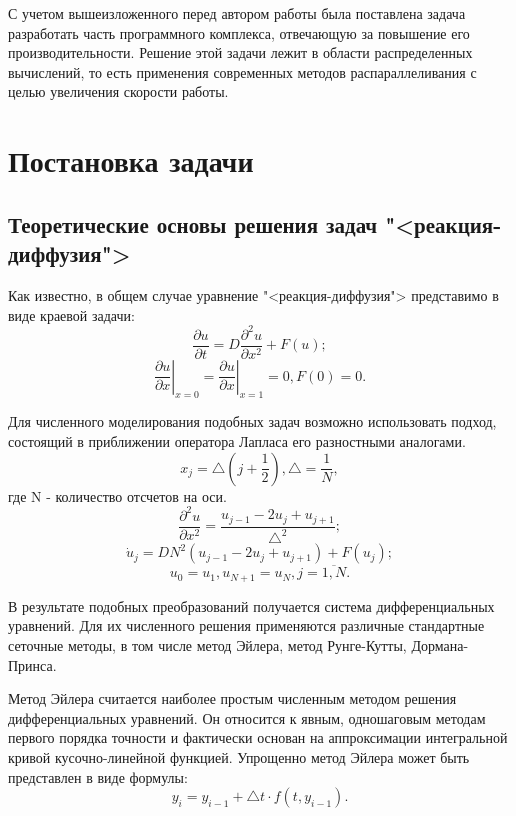 \documentclass[a4paper, 14pt]{extarticle}
\theoremstyle{definition}
\begin{document}
\par С учетом вышеизложенного перед автором работы была поставлена задача разработать часть программного комплекса, отвечающую за повышение его производительности. Решение этой задачи лежит в области распределенных вычислений, то есть применения современных методов распараллеливания с целью увеличения скорости работы.





\section{Постановка задачи}

\subsection{Теоретические основы решения задач "<реакция-диффузия">}

\par Как известно, в общем случае уравнение "<реакция-диффузия"> представимо в виде краевой задачи:
$$\frac{\partial u}{\partial t} = D \frac{\partial^2 u}{\partial x^2} + F(u);$$
$$\left.{\frac{\partial u}{\partial x}} \right|_{x=0} = \left.{\frac{\partial u}{\partial x}} \right|_{x=1} = 0, F(0) = 0.$$

\par Для численного моделирования подобных задач возможно использовать подход, состоящий в приближении оператора Лапласа его разностными аналогами.
$$x_j = \bigtriangleup(j + \frac{1}{2}), \bigtriangleup = \frac{1}{N},$$
где N - количество отсчетов на оси.
$$\frac{\partial^2 u}{\partial x^2} = \frac{u_{j-1} - 2u_j + u_{j+1}}{\bigtriangleup^2};$$
$$\dot u_j = D N^2(u_{j-1} - 2u_j + u_{j+1}) + F(u_j);$$
$$u_0 = u_1, u_{N+1} = u_N, j = \overline{1, N}.$$

\par В результате подобных преобразований получается система дифференциальных уравнений. Для их численного решения применяются различные стандартные сеточные методы, в том числе метод Эйлера, метод Рунге-Кутты, Дормана-Принса.

\par Метод Эйлера считается наиболее простым численным методом решения дифференциальных уравнений. Он относится к явным, одношаговым методам первого порядка точности и фактически основан на аппроксимации интегральной кривой кусочно-линейной функцией. Упрощенно метод Эйлера может быть представлен в виде формулы:
$$y_i = y_{i-1} + \bigtriangleup t \cdot f(t, y_{i-1}).$$
\end{document}
